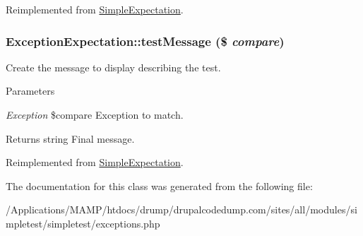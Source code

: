 Reimplemented from \hyperlink{class_simple_expectation_aa2b98f827e7487ebe12cedb9ad39d061}{SimpleExpectation}.\hypertarget{class_exception_expectation_afe072b85351847a113ee868c6548fbc5}{
\subsubsection[{testMessage}]{\setlength{\rightskip}{0pt plus 5cm}ExceptionExpectation::testMessage (\$ {\em compare})}}
\label{class_exception_expectation_afe072b85351847a113ee868c6548fbc5}
Create the message to display describing the test. 
\begin{DoxyParams}{Parameters}
\item[{\em Exception}]\$compare Exception to match. \end{DoxyParams}
\begin{DoxyReturn}{Returns}
string Final message. 
\end{DoxyReturn}


Reimplemented from \hyperlink{class_simple_expectation_a15b69edf659c76f6543aa98d8d85b025}{SimpleExpectation}.

The documentation for this class was generated from the following file:\begin{DoxyCompactItemize}
\item 
/Applications/MAMP/htdocs/drump/drupalcodedump.com/sites/all/modules/simpletest/simpletest/exceptions.php\end{DoxyCompactItemize}
